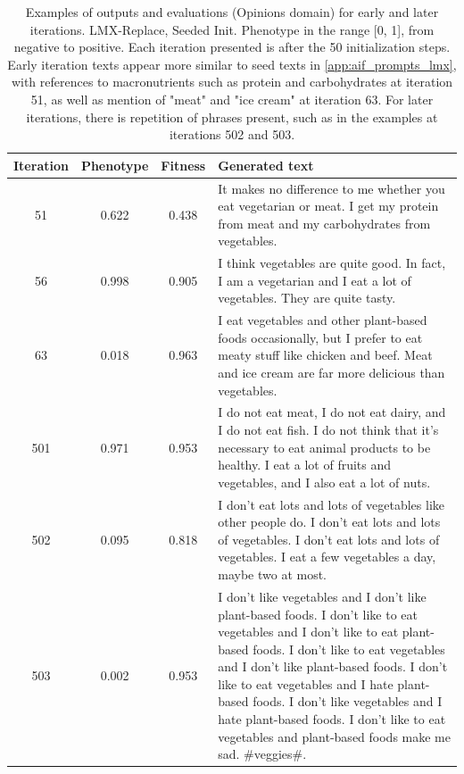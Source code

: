 \begin{table}[ht]
  \caption{Examples of outputs and evaluations (Opinions domain) for early and later iterations. LMX-Replace, Seeded Init. Phenotype in the range [0, 1], from negative to positive. Each iteration presented is after the 50 initialization steps. Early iteration texts appear more similar to seed texts in \ref{app:aif_prompts_lmx}, with references to macronutrients such as protein and carbohydrates at iteration 51, as well as mention of "meat" and "ice cream" at iteration 63. For later iterations, there is repetition of phrases present, such as in the examples at iterations 502 and 503.}
  \begin{center}
  \small
  \begin{tabular}{cccp{8.5cm}}
    \toprule
    Iteration     & Phenotype  & Fitness     & Generated text \\
    \midrule
    51 &  0.622 & 0.438 &  It makes no difference to me whether you eat vegetarian or meat. I get my protein from meat and my carbohydrates from vegetables. \\
    \midrule
    56 & 0.998 & 0.905 &  I think vegetables are quite good. In fact, I am a vegetarian and I eat a lot of vegetables. They are quite tasty. \\
    \midrule
    63 & 0.018 & 0.963 &  I eat vegetables and other plant-based foods occasionally, but I prefer to eat meaty stuff like chicken and beef. Meat and ice cream are far more delicious than vegetables. \\
    \midrule
    \midrule
    501 &  0.971 & 0.953 & I do not eat meat, I do not eat dairy, and I do not eat fish. I do not think that it's necessary to eat animal products to be healthy. I eat a lot of fruits and vegetables, and I also eat a lot of nuts. \\
    \midrule
    502 & 0.095 & 0.818 & I don't eat lots and lots of vegetables like other people do. I don't eat lots and lots of vegetables. I don't eat lots and lots of vegetables. I eat a few vegetables a day, maybe two at most. \\
    \midrule
    503 & 0.002 & 0.953 & I don't like vegetables and I don't like plant-based foods. I don't like to eat vegetables and I don't like to eat plant-based foods. I don't like to eat vegetables and I don't like plant-based foods. I don't like to eat vegetables and I hate plant-based foods. I don't like vegetables and I hate plant-based foods. I don't like to eat vegetables and plant-based foods make me sad. \#veggies\#. \\
    \bottomrule
  \end{tabular}
  \end{center}
  \label{app:table_iter_opinions_replace_seed}
\end{table}